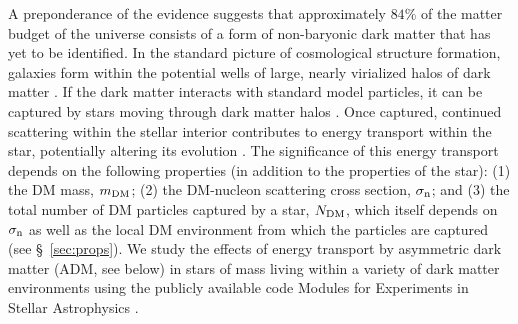 \documentclass[useAMS,usenatbib]{mnras}
\begin{document}


  A preponderance of the evidence suggests that approximately $84\%$ of the matter budget of the 
  universe consists of a form of non-baryonic dark matter that has yet to be identified. 
   In 
  the standard picture of cosmological structure formation, 
  galaxies form within the potential wells of 
  large, nearly virialized halos of dark matter \citep{white_rees78,blumenthal_etal84}. 
  If the dark matter interacts with standard model particles, 
  it can be captured by stars moving through dark matter halos 
  \citep{press_spergel85,krauss_etal85, gaisser_etal86, griest_seckel87}. 
  Once captured, continued scattering within the stellar interior contributes 
  to energy transport within the star, potentially altering its evolution \citep{Spergel1985EffectInterior, Zentner2011AsymmetricDwarfs} 
   . 
  The significance of this energy transport depends on the following 
  properties (in addition to the properties of the star): 
  (1) the DM mass, $m_{\mathrm{DM}}$; 
  (2) the DM-nucleon scattering cross section, $\sigma_{\mathrm{n}}$; 
  and (3) the total number of DM particles captured by a star, $N_{\mathrm{DM}}$, 
  which itself depends on $\sigma_{\mathrm{n}}$ as well as the local DM environment from 
which the particles are captured (see \S~\ref{sec:props}). 
We study the effects of energy transport by asymmetric dark matter 
(ADM, see below)
in stars of mass \mrange living within a variety of dark matter 
environments using the publicly available code 
Modules for Experiments in Stellar Astrophysics \citep[\mesa,][]{Paxton2011ModulesMESA}.
\end{document}
